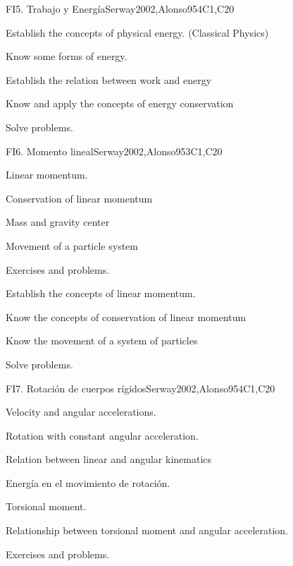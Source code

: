\begin{syllabus}
\begin{unit}{FI5. Trabajo y Energí­a}{}{Serway2002,Alonso95}{4}{C1,C20}
   \begin{learningoutcomes}
      \item Establish the concepts of physical energy. (Classical Physics)
      \item Know some forms of energy.
      \item Establish the relation between work and energy
      \item Know and apply the concepts of energy conservation
      \item Solve problems.
   \end{learningoutcomes}
\end{unit}

\begin{unit}{FI6. Momento lineal}{}{Serway2002,Alonso95}{3}{C1,C20}
\begin{topics}
      \item Linear momentum.
      \item Conservation of linear momentum
      \item Mass and gravity center
      \item Movement of a particle system
      \item Exercises and problems.
  \end{topics}

   \begin{learningoutcomes}
      \item Establish the concepts of linear momentum.
      \item Know the concepts of conservation of linear momentum
      \item Know the movement of a system of particles
      \item Solve problems.
   \end{learningoutcomes}
\end{unit}

\begin{unit}{FI7. Rotación de cuerpos rígidos}{}{Serway2002,Alonso95}{4}{C1,C20}
\begin{topics}
      \item Velocity and angular accelerations.
      \item Rotation with constant angular acceleration.
      \item Relation between linear and angular kinematics
      \item Energí­a en el movimiento de rotación.
      \item Torsional moment.
      \item Relationship between torsional moment and angular acceleration.
      \item Exercises and problems.
   \end{topics}


\end{unit}
\end{syllabus}
